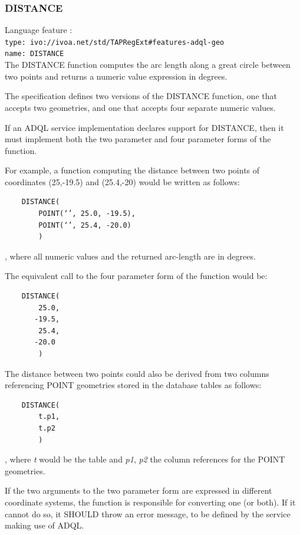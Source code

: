 \documentclass[11pt,a4paper]{ivoa}
\begin{document}
\subsubsection{DISTANCE}
\label{sec:geom.functions.distance}
{\footnotesize Language feature :}\\
{\footnotesize \verb|type: ivo://ivoa.net/std/TAPRegExt#features-adql-geo|}\\
{\footnotesize \verb|name: DISTANCE|}\\

The DISTANCE function computes the arc length along a great circle between two
points and returns a numeric value expression in degrees.

The specification defines two versions of the DISTANCE function, one that
accepts two geometries, and one that accepts four separate numeric
values.

If an ADQL service implementation declares support for DISTANCE,
then it must implement both the two parameter and four parameter
forms of the function.

For example, a function computing the distance between two points of
coordinates (25,-19.5) and (25.4,-20) would be written as follows:

\begin{verbatim}
    DISTANCE(
        POINT(‘’, 25.0, -19.5),
        POINT(‘’, 25.4, -20.0)
        )
\end{verbatim}

, where all numeric values and the returned arc-length are in degrees.

The equivalent call to the four parameter form of the function would be:

\begin{verbatim}
    DISTANCE(
        25.0,
       -19.5,
        25.4,
       -20.0
        )
\end{verbatim}

The distance between two points could also be derived from two columns
referencing POINT geometries stored in the database tables as follows:

\begin{verbatim}
    DISTANCE(
        t.p1,
        t.p2
        )
\end{verbatim}

, where \textit{t} would be the table and \textit{p1}, \textit{p2} the column
references for the POINT geometries.

If the two arguments to the two parameter form are expressed in different
coordinate systems, the function is responsible for converting one (or both).
If it cannot do so, it SHOULD throw an error message, to be defined by
the service making use of ADQL.
\end{document}

